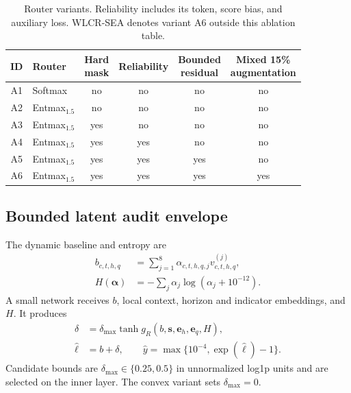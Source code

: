 \documentclass[10pt,conference,letterpaper]{IEEEtran}
\renewcommand{\arraystretch}{1.06}
\newcommand{\method}{WLCR-SEA}
\begin{document}
\begin{table}[t]
\centering
\caption{Router variants. Reliability includes its token, score bias, and auxiliary loss. \method{} denotes variant A6 outside this ablation table.}
\label{tab:variants}
\footnotesize
\setlength{\tabcolsep}{2.0pt}
\renewcommand{\arraystretch}{1.05}
\begin{tabular*}{\columnwidth}{@{\extracolsep{\fill}}clcccc@{}}
\toprule
ID & Router & \shortstack{Hard\\mask} & Reliability & \shortstack{Bounded\\residual} & \shortstack{Mixed 15\%\\augmentation}\\
\midrule
A1 & Softmax & no & no & no & no\\
A2 & Entmax$_{1.5}$ & no & no & no & no\\
A3 & Entmax$_{1.5}$ & yes & no & no & no\\
A4 & Entmax$_{1.5}$ & yes & yes & no & no\\
A5 & Entmax$_{1.5}$ & yes & yes & yes & no\\
A6 & Entmax$_{1.5}$ & yes & yes & yes & yes\\
\bottomrule
\end{tabular*}
\end{table}

\subsection{Bounded latent audit envelope}
The dynamic baseline and entropy are
\begin{align}
b_{c,t,h,q}&=\sum_{j=1}^{8}\alpha_{c,t,h,q,j}v^{(j)}_{c,t,h,q},\\
H(\boldsymbol\alpha)&=-\sum_j\alpha_j\log(\alpha_j+10^{-12}).
\end{align}
A small network receives $b$, local context, horizon and indicator embeddings, and $H$. It produces
\begin{align}
\delta&=\delta_{\max}\tanh g_R(b,\mathbf s,\mathbf e_h,\mathbf e_q,H),\\
\widehat\ell&=b+\delta,\qquad
\widehat y=\max\{10^{-4},\exp(\widehat\ell)-1\}.
\end{align}
Candidate bounds are $\delta_{\max}\in\{0.25,0.5\}$ in unnormalized log1p units and are selected on the inner layer. The convex variant sets $\delta_{\max}=0$.
\end{document}
